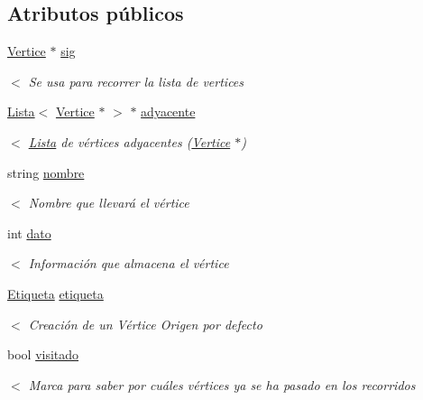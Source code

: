 \subsection*{Atributos públicos}
\begin{DoxyCompactItemize}
\item 
\mbox{\label{classVertice_ad71c11896bd1657ca33117c1c2f08ed3}} 
\hyperlink{classVertice}{Vertice} $\ast$ \hyperlink{classVertice_ad71c11896bd1657ca33117c1c2f08ed3}{sig}
\begin{DoxyCompactList}\small\item\em $<$ Se usa para recorrer la lista de vertices \end{DoxyCompactList}\item 
\mbox{\label{classVertice_a740d1d3cf0a6fad9b0d49832e8c2cd55}} 
\hyperlink{classLista}{Lista}$<$ \hyperlink{classVertice}{Vertice} $\ast$ $>$ $\ast$ \hyperlink{classVertice_a740d1d3cf0a6fad9b0d49832e8c2cd55}{adyacente}
\begin{DoxyCompactList}\small\item\em $<$ \hyperlink{classLista}{Lista} de vértices adyacentes (\hyperlink{classVertice}{Vertice} $\ast$) \end{DoxyCompactList}\item 
\mbox{\label{classVertice_ab23a005b5c7802792ec2277227ba4d83}} 
string \hyperlink{classVertice_ab23a005b5c7802792ec2277227ba4d83}{nombre}
\begin{DoxyCompactList}\small\item\em $<$ Nombre que llevará el vértice \end{DoxyCompactList}\item 
\mbox{\label{classVertice_accb96991da9db4ee82280acf2019d1dc}} 
int \hyperlink{classVertice_accb96991da9db4ee82280acf2019d1dc}{dato}
\begin{DoxyCompactList}\small\item\em $<$ Información que almacena el vértice \end{DoxyCompactList}\item 
\mbox{\label{classVertice_af36574fd5dd94e1f7a57ef56e62213e6}} 
\hyperlink{classEtiqueta}{Etiqueta} \hyperlink{classVertice_af36574fd5dd94e1f7a57ef56e62213e6}{etiqueta}
\begin{DoxyCompactList}\small\item\em $<$ Creación de un Vértice Origen por defecto \end{DoxyCompactList}\item 
\mbox{\label{classVertice_a883addd1f202e3fbae518d32ee933c99}} 
bool \hyperlink{classVertice_a883addd1f202e3fbae518d32ee933c99}{visitado}
\begin{DoxyCompactList}\small\item\em $<$ Marca para saber por cuáles vértices ya se ha pasado en los recorridos \end{DoxyCompactList}\end{DoxyCompactItemize}
